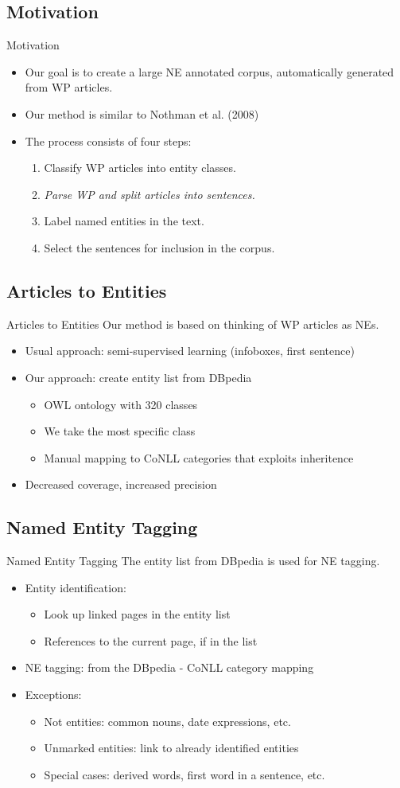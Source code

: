 \documentclass[utf8x,t]{beamer}
\newcommand{\vitem}{\vfill \item}
\begin{document}
\subsection*{Motivation}
\begin{frame}{Motivation}
  \begin{itemize}
  \vitem Our goal is to create a large NE annotated corpus, automatically
        generated from WP articles.
  \vitem Our method is similar to Nothman et al. (2008)
  \vitem The process consists of four steps:
    \begin{enumerate}
    \vitem Classify WP articles into entity classes.
    \vitem \textit{Parse WP and split articles into sentences.}
    \vitem Label named entities in the text.
    \vitem Select the sentences for inclusion in the corpus.
    \end{enumerate}
  \end{itemize}
\end{frame}

\subsection{Articles to Entities}
\begin{frame}{Articles to Entities}
  Our method is based on thinking of WP articles as NEs.
  \begin{itemize}
  \vitem Usual approach: semi-supervised learning (infoboxes, first sentence)
  \vitem Our approach: create entity list from DBpedia
    \begin{itemize}
    \vitem OWL ontology with 320 classes
    \vitem We take the most specific class
    \vitem Manual mapping to CoNLL categories that exploits inheritence
    \end{itemize}
  \vitem Decreased coverage, increased precision
  \end{itemize}
\end{frame}

\subsection{Named Entity Tagging}
\begin{frame}{Named Entity Tagging}
  The entity list from DBpedia is used for NE tagging.
  \begin{itemize}
  \vitem Entity identification:
    \begin{itemize}
    \vitem Look up linked pages in the entity list
    \vitem References to the current page, if in the list
    \end{itemize}
  \vitem NE tagging: from the DBpedia - CoNLL category mapping
  \vitem Exceptions:
    \begin{itemize}
    \vitem Not entities: common nouns, date expressions, etc.
    \vitem Unmarked entities: link to already identified entities
    \vitem Special cases: derived words, first word in a sentence, etc.
    \end{itemize}
  \end{itemize}
\end{frame}
\end{document}
